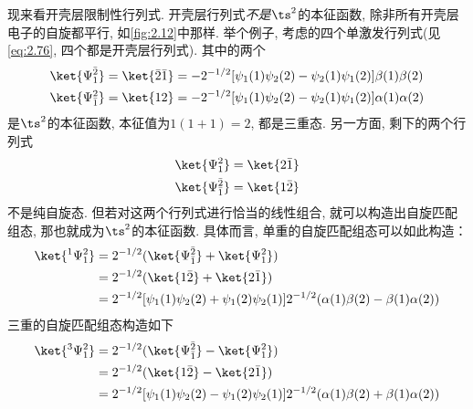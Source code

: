 现来看开壳层限制性行列式. 
开壳层行列式\emph{不是}$\ts^2$的本征函数, 
除非所有开壳层电子的自旋都平行, 
如\autoref{fig:2.12}中那样. 
举个例子, 
考虑的四个单激发行列式(见\autoref{eq:2.76}, 
四个都是开壳层行列式). 
其中的两个
\begin{subequations}\label{eq:2.258}
	\begin{align}
	\ket{\Psi_1^{\bar{2}}} & = \ket{\bar{2}\bar{1}} = -2^{-1/2}[\psi_1(1)\psi_2(2) - \psi_2(1)\psi_1(2)]\beta(1)\beta(2)\\
	\ket{\Psi_{\bar{1}}^2} & = \ket{12}  = -2^{-1/2}[\psi_1(1)\psi_2(2) - \psi_2(1)\psi_1(2)]\alpha(1)\alpha(2)
	\end{align}
\end{subequations} 
是$\ts^2$的本征函数, 
本征值为$1(1+1)=2$, 
都是三重态. 
另一方面, 
剩下的两个行列式
\begin{subequations}\label{eq:2.259}
	\begin{align}
	\ket{\Psi_1^2} & = \ket{2\bar{1}}\\
	\ket{\Psi_{\bar{1}}^{\bar{2}}} & = \ket{1\bar{2}}
	\end{align}
\end{subequations} 
不是纯自旋态. 
但若对这两个行列式进行恰当的线性组合, 
就可以构造出自旋匹配组态, 
那也就成为$\ts^2$的本征函数. 
具体而言, 
单重的自旋匹配组态可以如此构造：
\begin{align}
\ket{^1\Psi_1^2} & = 2^{-1/2}(\ket{\Psi_{\bar{1}}^{\bar{2}}} + \ket{\Psi_1^2}) \notag\\
& =2^{-1/2}(\ket{1\bar{2}} + \ket{2\bar{1}})\notag \\
	& =2^{-1/2}[ \psi_1(1)\psi_2(2) + \psi_1(2)\psi_2(1)] 2^{-1/2}(\alpha(1)\beta(2) - \beta(1)\alpha(2)) \label{eq:2.260}
\end{align}
三重的自旋匹配组态构造如下
\begin{align}
\ket{^3\Psi_1^2} & = 2^{-1/2}(\ket{\Psi_{\bar{1}}^{\bar{2}}} - \ket{\Psi_1^2}) \notag\\
& =2^{-1/2}(\ket{1\bar{2}} - \ket{2\bar{1}})\notag \\
& =2^{-1/2}[ \psi_1(1)\psi_2(2) - \psi_1(2)\psi_2(1)] 2^{-1/2}(\alpha(1)\beta(2) + \beta(1)\alpha(2))
\end{align}

